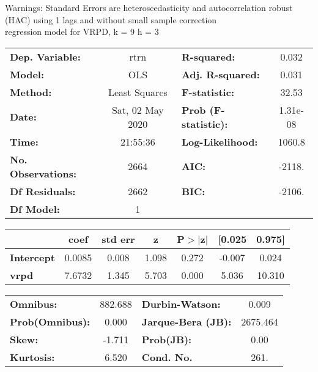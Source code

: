 Warnings: \newline
 [1] Standard Errors are heteroscedasticity and autocorrelation robust (HAC) using 1 lags and without small sample correction\\ 

regression model for VRPD, k = 9 h = 3\begin{center}
\begin{tabular}{lclc}
\toprule
\textbf{Dep. Variable:}    &       rtrn       & \textbf{  R-squared:         } &     0.032   \\
\textbf{Model:}            &       OLS        & \textbf{  Adj. R-squared:    } &     0.031   \\
\textbf{Method:}           &  Least Squares   & \textbf{  F-statistic:       } &     32.53   \\
\textbf{Date:}             & Sat, 02 May 2020 & \textbf{  Prob (F-statistic):} &  1.31e-08   \\
\textbf{Time:}             &     21:55:36     & \textbf{  Log-Likelihood:    } &    1060.8   \\
\textbf{No. Observations:} &        2664      & \textbf{  AIC:               } &    -2118.   \\
\textbf{Df Residuals:}     &        2662      & \textbf{  BIC:               } &    -2106.   \\
\textbf{Df Model:}         &           1      & \textbf{                     } &             \\
\bottomrule
\end{tabular}
\begin{tabular}{lcccccc}
                   & \textbf{coef} & \textbf{std err} & \textbf{z} & \textbf{P$> |$z$|$} & \textbf{[0.025} & \textbf{0.975]}  \\
\midrule
\textbf{Intercept} &       0.0085  &        0.008     &     1.098  &         0.272        &       -0.007    &        0.024     \\
\textbf{vrpd}      &       7.6732  &        1.345     &     5.703  &         0.000        &        5.036    &       10.310     \\
\bottomrule
\end{tabular}
\begin{tabular}{lclc}
\textbf{Omnibus:}       & 882.688 & \textbf{  Durbin-Watson:     } &    0.009  \\
\textbf{Prob(Omnibus):} &   0.000 & \textbf{  Jarque-Bera (JB):  } & 2675.464  \\
\textbf{Skew:}          &  -1.711 & \textbf{  Prob(JB):          } &     0.00  \\
\textbf{Kurtosis:}      &   6.520 & \textbf{  Cond. No.          } &     261.  \\
\bottomrule
\end{tabular}
\end{center}

